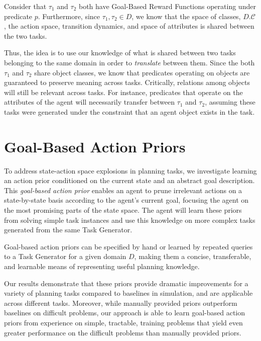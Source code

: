 \documentclass[11pt]{article}
\begin{document}
Consider that $\tau_1$ and $\tau_2$ both have Goal-Based Reward Functions operating under predicate $p$. Furthermore, since $\tau_1, \tau_2 \in D$, we know that the space of classes, $D.\mathcal{C}$, the action space, transition dynamics, and space of attributes is shared between the two tasks.

Thus, the idea is to use our knowledge of what is shared between two tasks belonging to the same domain in order to {\it translate} between them. Since the both $\tau_1$ and $\tau_2$ share object classes, we know that predicates operating on objects are guaranteed to preserve meaning across tasks. Critically, relations among objects will still be relevant across tasks. For instance, predicates that operate on the attributes of the agent will necessarily transfer between $\tau_1$ and $\tau_2$, assuming these tasks were generated under the constraint that an agent object exists in the task.

\section{Goal-Based Action Priors}
\label{sec:gbaps}

To address state-action space explosions in planning tasks,
we investigate learning an action prior conditioned on the current state and an abstract goal description. This {\it goal-based action prior}
enables an agent to prune irrelevant actions on a
state-by-state basis according to the agent's current goal, focusing the agent on
the most promising parts of the state space. The agent will learn these priors from solving simple task instances and use this knowledge on more complex tasks generated from the same Task Generator.
 
Goal-based action priors can be specified
by hand or learned by repeated queries to a Task Generator for a given domain $D$, making them a concise, transferable, and learnable means of
representing useful planning knowledge. 

Our results demonstrate
that these priors provide dramatic improvements for a variety of
planning tasks compared to baselines in simulation, and are applicable
across different tasks.  Moreover, while manually provided
priors outperform baselines on difficult problems, our approach
is able to learn goal-based action priors from experience on simple, tractable, 
training problems that yield even greater performance on the difficult problems
than manually provided priors.
\end{document}
